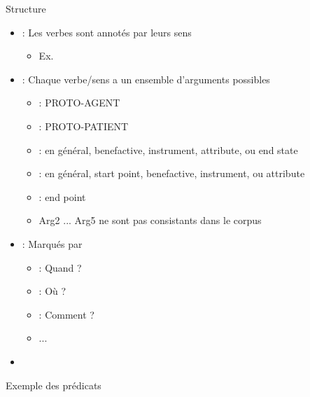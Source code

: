 \documentclass{KodeBook}
\begin{document}
Structure
\begin{itemize}
	\item {} : Les verbes sont annotés par leurs sens 
	\begin{itemize}
		\item Ex. 		
	\end{itemize}
	
	\item {} : Chaque verbe/sens a un ensemble d'arguments possibles  
	\begin{itemize}
		\item {} : PROTO-AGENT
		\item {} : PROTO-PATIENT
		\item {} : en général, benefactive, instrument, attribute, ou end state
		\item {} : en général, start point, benefactive, instrument, ou attribute
		\item {} : end point
		\item Arg2 ... Arg5 ne sont pas consistants dans le corpus
	\end{itemize}
	
	\item {} : Marqués par   
	\begin{itemize}
		\item {} : Quand ?
		\item {} : Où ?
		\item {} : Comment ? 
		\item ...
	\end{itemize}
	
	\item {} 
\end{itemize}

 Exemple des prédicats
 
\end{document}
